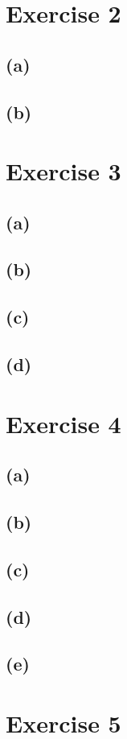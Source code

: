\documentclass[12pt]{article}
\begin{document}
\section*{Exercise 2}
\subsection*{(a)}
\subsection*{(b)}

\section*{Exercise 3}
\subsection*{(a)}
\subsection*{(b)}
\subsection*{(c)}
\subsection*{(d)}

\section*{Exercise 4}
\subsection*{(a)}
\subsection*{(b)}
\subsection*{(c)}
\subsection*{(d)}
\subsection*{(e)}

\section*{Exercise 5}
\end{document}
